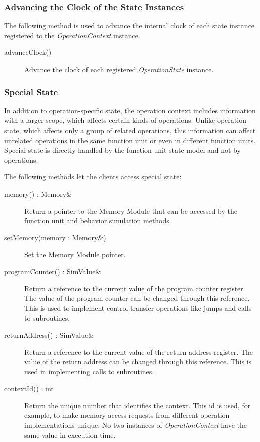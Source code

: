 \documentclass[a4paper,twoside]{tce}
\begin{document}
\subsubsection{Advancing the Clock of the State Instances}

The following method is used to advance the internal clock of each state
instance registered to the \emph{OperationContext} instance.

\begin{description}
\item[advanceClock()] %
  Advance the clock of each registered \emph{OperationState} instance.
\end{description}

\subsubsection{Special State}
In addition to operation-specific state, the operation context includes
information with a larger scope, which affects certain kinds of operations.
Unlike operation state, which affects only a group of related operations,
this information can affect unrelated operations in the same function unit
or even in different function units. Special state is directly handled by
the function unit state model and not by operations.

The following methods let the clients access special state:
\begin{description}
\item[memory() : Memory\&]%

  Return a pointer to the Memory Module that can be accessed by the
  function unit and behavior simulation methods. 
  
\item[setMemory(memory : Memory\&)]%

  Set the Memory Module pointer. 

\item[programCounter() : SimValue\&]%

  Return a reference to the current value of the program counter register.
  The value of the program counter can be changed through this reference.
  This is used to implement control transfer operations like jumps and
  calls to subroutines. 

\item[returnAddress() : SimValue\&] %

  Return a reference to the current value of the return address
  register.  The value of the return address can be changed through
  this reference.  This is used in implementing calls to
  subroutines. 

\item[contextId() : int] %
  
  Return the unique number that identifies the context. This id is used,
  for example, to make memory access requests from different operation
  implementations unique.  No two instances of \emph{OperationContext} have
  the same value in execution time. 

\end{description}
\end{document}
